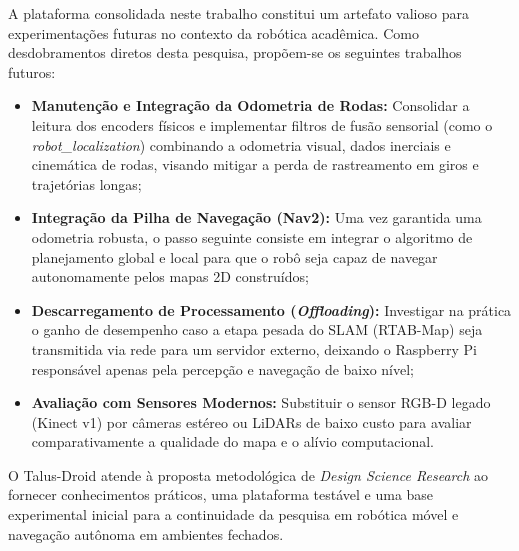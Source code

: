 A plataforma consolidada neste trabalho constitui um artefato valioso para experimentações futuras no contexto da robótica acadêmica. Como desdobramentos diretos desta pesquisa, propõem-se os seguintes trabalhos futuros:

\begin{itemize}
    \item \textbf{Manutenção e Integração da Odometria de Rodas:} Consolidar a leitura dos encoders físicos e implementar filtros de fusão sensorial (como o \textit{robot\_localization}) combinando a odometria visual, dados inerciais e cinemática de rodas, visando mitigar a perda de rastreamento em giros e trajetórias longas;
    \item \textbf{Integração da Pilha de Navegação (Nav2):} Uma vez garantida uma odometria robusta, o passo seguinte consiste em integrar o algoritmo de planejamento global e local para que o robô seja capaz de navegar autonomamente pelos mapas 2D construídos;
    \item \textbf{Descarregamento de Processamento (\textit{Offloading}):} Investigar na prática o ganho de desempenho caso a etapa pesada do SLAM (RTAB-Map) seja transmitida via rede para um servidor externo, deixando o Raspberry Pi responsável apenas pela percepção e navegação de baixo nível;
    \item \textbf{Avaliação com Sensores Modernos:} Substituir o sensor RGB-D legado (Kinect v1) por câmeras estéreo ou LiDARs de baixo custo para avaliar comparativamente a qualidade do mapa e o alívio computacional.
\end{itemize}

O Talus-Droid atende à proposta metodológica de \textit{Design Science Research} ao fornecer conhecimentos práticos, uma plataforma testável e uma base experimental inicial para a continuidade da pesquisa em robótica móvel e navegação autônoma em ambientes fechados.

